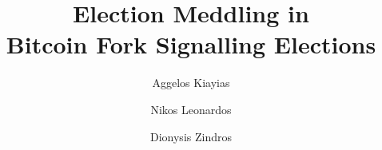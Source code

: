 \title{
  Election Meddling in\\
  Bitcoin Fork Signalling Elections
}
\author{
        Aggelos Kiayias \and
        Nikos Leonardos \and
        Dionysis Zindros
}
\maketitle
\noindent
\makebox[\linewidth]{\today}
